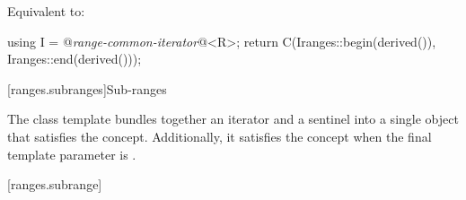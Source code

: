 \begin{itemdescr}
\pnum
\effects Equivalent to:
\begin{codeblock}
using I = @\textit{range-common-iterator}@<R>;
return C(I{ranges::begin(derived())}, I{ranges::end(derived())});
\end{codeblock}
\end{itemdescr}

[ranges.subranges]{Sub-ranges}

\pnum
The  class template bundles together an
iterator and a sentinel into a single object that satisfies the  concept. Additionally,
it satisfies the  concept when the final template parameter is .


[ranges.subrange]{}

